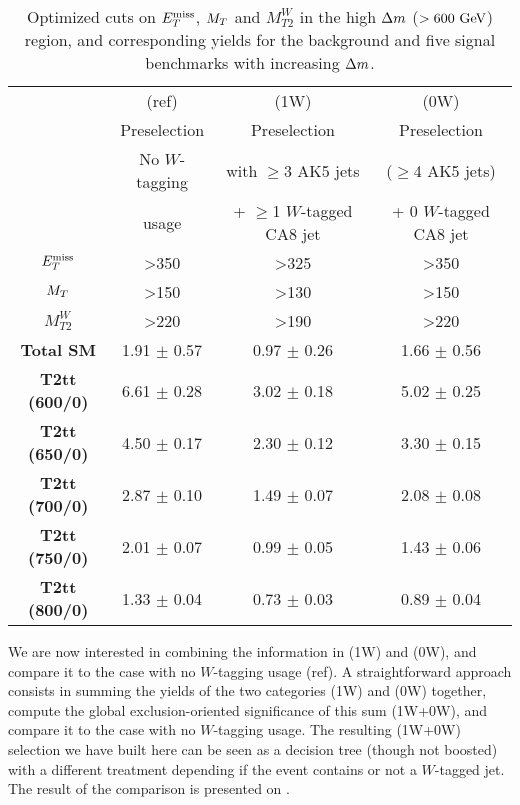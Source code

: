     \begin{table}
        \centering
        \begin{tabular}{c|c|cc}
                                   & (ref)             & (1W)                         & (0W)                    \\
                                   & Preselection      & Preselection                 & Preselection           \\
                                   & No $W$-tagging    & with $\geq$3 AK5 jets        & ($\geq$4 AK5 jets)     \\
                                   & usage             & + $\geq$1 $W$-tagged CA8 jet & + 0 $W$-tagged CA8 jet \\
            \hline
            \textbf{$E_T^\text{miss}$}        & >350              & >325 & >350 \\
            \textbf{$M_T$}         & >150              & >130 & >150 \\
            \textbf{$M_{T2}^{W}$}  & >220              & >190 & >220 \\
            \hline
            \hline
            \textbf{Total SM}      & 1.91 $\pm$ 0.57   & 0.97 $\pm$ 0.26     &  1.66 $\pm$ 0.56    \\
            \hline
            \textbf{T2tt (600/0)}   & 6.61 $\pm$ 0.28  & 3.02 $\pm$ 0.18     &  5.02 $\pm$ 0.25    \\
            \textbf{T2tt (650/0)}   & 4.50 $\pm$ 0.17  & 2.30 $\pm$ 0.12     &  3.30 $\pm$ 0.15    \\
            \textbf{T2tt (700/0)}   & 2.87 $\pm$ 0.10  & 1.49 $\pm$ 0.07     &  2.08 $\pm$ 0.08    \\
            \textbf{T2tt (750/0)}   & 2.01 $\pm$ 0.07  & 0.99 $\pm$ 0.05     &  1.43 $\pm$ 0.06    \\
            \textbf{T2tt (800/0)}   & 1.33 $\pm$ 0.04  & 0.73 $\pm$ 0.03     &  0.89 $\pm$ 0.04
        \end{tabular}
        \caption{Optimized cuts on $E_T^\text{miss}$, $M_T$ and $M_{T2}^{W}$ in the high
        $\Delta m$ ($> 600~\text{GeV}$) region, and corresponding yields for the
        background and five signal benchmarks with increasing $\Delta m$.}
        \label{tab:wTaggingAnalysisCuts}
    \end{table}

    We are now interested in combining the information in (1W) and (0W), and
    compare it to the case with no $W$-tagging usage (ref). A straightforward
    approach consists in summing the yields of the two categories (1W) and (0W)
    together, compute the global exclusion-oriented significance of this sum
    (1W+0W), and compare it to the case with no $W$-tagging usage. The resulting
    (1W+0W) selection we have built here can be seen as a decision tree (though
    not boosted) with a different treatment depending if the event contains or
    not a $W$-tagged jet. The result of the comparison is presented on
    .

